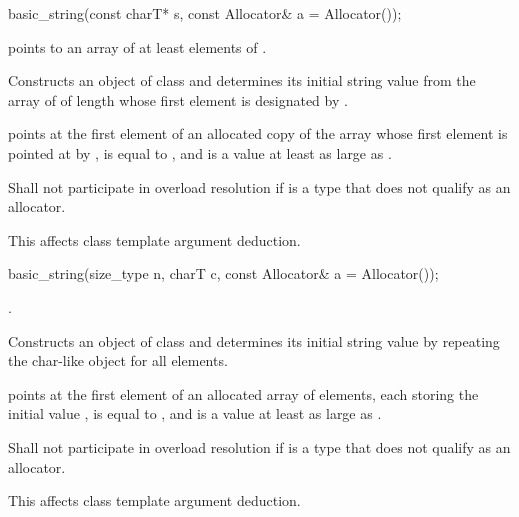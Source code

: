 %
\begin{itemdecl}
basic_string(const charT* s, const Allocator& a = Allocator());
\end{itemdecl}

\begin{itemdescr}
\pnum
\requires
{} points to an array of at least  elements
of .

\pnum
\effects
Constructs an object of class 
and determines its initial string value from the array of
 of length 
whose first element is designated by .

\pnum
\ensures
{} points at the first element of an allocated copy
of the array whose first element is pointed at by ,
 is equal to , and
 is a value at least as large as .

\pnum
\remarks
Shall not participate in overload resolution
if  is a type
that does not qualify as an allocator.
\begin{note}
This affects class template argument deduction.
\end{note}
\end{itemdescr}

%
\begin{itemdecl}
basic_string(size_type n, charT c, const Allocator& a = Allocator());
\end{itemdecl}

\begin{itemdescr}
\pnum
\requires
{}.

\pnum
\effects
Constructs an object of class 
and determines its initial string value by repeating the char-like
object  for all  elements.

\pnum
\ensures
{} points at the first element of an allocated array
of  elements, each storing the initial value ,
 is equal to , and
 is a value at least as large as .

\pnum
\remarks
Shall not participate in overload resolution
if  is a type
that does not qualify as an allocator.
\begin{note}
This affects class template argument deduction.
\end{note}
\end{itemdescr}

